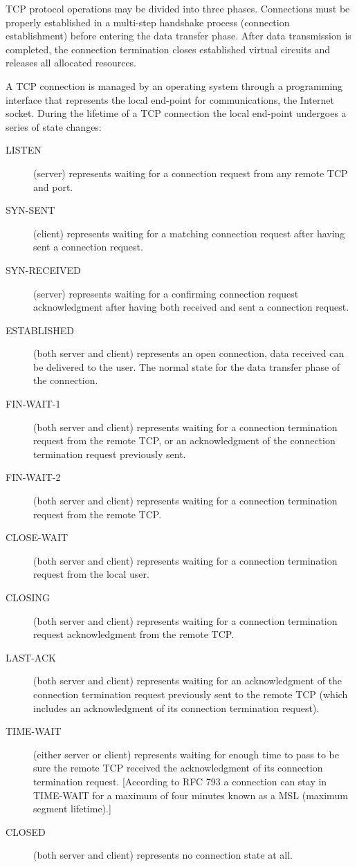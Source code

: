  TCP protocol operations may be divided
into three phases. Connections must be properly established in a multi-step handshake
process (connection establishment) before entering the data transfer phase. After data
transmission is completed, the connection termination closes established virtual circuits
and releases all allocated resources.

A TCP connection is managed by an operating system through a programming interface that
represents the local end-point for communications, the Internet socket. During the
lifetime of a TCP connection the local end-point undergoes a series of state
changes:

\begin{description}
\item[LISTEN] (server) represents waiting for a connection request from any remote TCP and
  port.
\item[SYN-SENT] (client) represents waiting for a matching connection request after having
  sent a connection request.
\item[SYN-RECEIVED] (server) represents waiting for a confirming connection request
  acknowledgment after having both received and sent a connection request.
\item[ESTABLISHED] (both server and client) represents an open connection, data received
  can be delivered to the user. The normal state for the data transfer phase of the
  connection.
\item[FIN-WAIT-1] (both server and client) represents waiting for a connection termination
  request from the remote TCP, or an acknowledgment of the connection termination request
  previously sent.
\item[FIN-WAIT-2] (both server and client) represents waiting for a connection termination
  request from the remote TCP.
\item[CLOSE-WAIT] (both server and client) represents waiting for a connection termination
  request from the local user.
\item[CLOSING] (both server and client) represents waiting for a connection termination
  request acknowledgment from the remote TCP.
\item[LAST-ACK] (both server and client) represents waiting for an acknowledgment of the
  connection termination request previously sent to the remote TCP (which includes an
  acknowledgment of its connection termination request).
\item[TIME-WAIT] (either server or client) represents waiting for enough time to pass to
  be sure the remote TCP received the acknowledgment of its connection termination
  request. [According to RFC 793 a connection can stay in TIME-WAIT for a maximum of four
  minutes known as a MSL (maximum segment lifetime).]
\item[CLOSED] (both server and client) represents no connection state at all.
\end{description}

